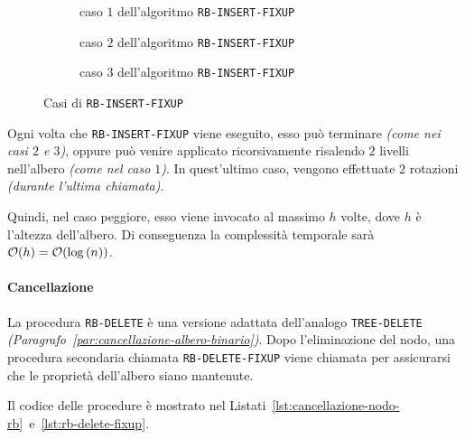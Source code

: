\documentclass[italian, 10pt]{article}
\begin{document}
\begin{figure}[htbp]
  \begin{subfigure}{\textwidth}
    \centering
    \bigskip
    \caption{caso \(1\) dell'algoritmo \texttt{RB-INSERT-FIXUP}}
    \label{fig:caso-1-algoritmo-rb-insert-fixup}
    \bigskip
  \end{subfigure}
  \begin{subfigure}{0.99\textwidth}
    \centering
    \bigskip
    \caption{caso \(2\) dell'algoritmo \texttt{RB-INSERT-FIXUP}}
    \label{fig:caso-2-algoritmo-rb-insert-fixup}
    \bigskip
  \end{subfigure}
  \begin{subfigure}{0.99\textwidth}
    \centering
    \bigskip
    \caption{caso \(3\) dell'algoritmo \texttt{RB-INSERT-FIXUP}}
    \label{fig:caso-3-algoritmo-rb-insert-fixup}
    \bigskip
  \end{subfigure}
  \caption{Casi di \texttt{RB-INSERT-FIXUP}}
  \label{fig:casi-algoritmo-rb-insert-fixup}
\end{figure}

\bigskip
Ogni volta che \texttt{RB-INSERT-FIXUP} viene eseguito, esso può terminare \textit{(come nei casi \(2\) e \(3\))}, oppure può venire applicato ricorsivamente risalendo \(2\) livelli nell'albero \textit{(come nel caso \(1\))}.
In quest'ultimo caso, vengono effettuate \(2\) rotazioni \textit{(durante l'ultima chiamata)}.

Quindi, nel caso peggiore, esso viene invocato al massimo \(h\) volte, dove \(h\) è l'altezza dell'albero.
Di conseguenza la complessità temporale sarà \(\mathcal{O}(h) = \mathcal{O}(\log{(n)})\).

\paragraph{Cancellazione}
\label{par:cancellazione-rb}

La procedura \texttt{RB-DELETE} è una versione adattata dell'analogo \texttt{TREE-DELETE} \textit{(Paragrafo~\ref{par:cancellazione-albero-binario})}.
Dopo l'eliminazione del nodo, una procedura secondaria chiamata \texttt{RB-DELETE-FIXUP} viene chiamata per assicurarsi che le proprietà dell'albero \RB siano mantenute.

Il codice delle procedure è mostrato nel Listati~\ref{lst:cancellazione-nodo-rb}~e~\ref{lst:rb-delete-fixup}.
\end{document}
